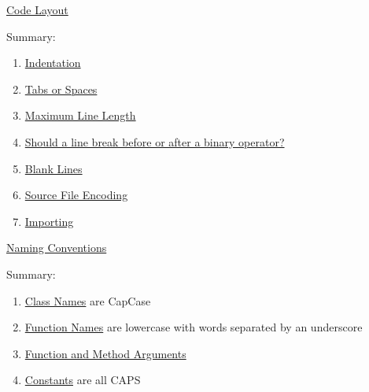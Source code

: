 \documentclass{beamer}
\begin{document}

\begin{frame}{\href{https://www.python.org/dev/peps/pep-0008/\#code-lay-out}{Code Layout}}

Summary:

\begin{enumerate}
    \item \href{https://www.python.org/dev/peps/pep-0008/\#indentation}{Indentation}
    \item \href{https://www.python.org/dev/peps/pep-0008/\#tabs-or-spaces}{Tabs or Spaces}
    \item \href{https://www.python.org/dev/peps/pep-0008/\#maximum-line-length}{Maximum Line Length}
    \item \href{https://www.python.org/dev/peps/pep-0008/\#should-a-line-break-before-or-after-a-binary-operator}{Should a line break before or after a binary operator?}
    \item \href{https://www.python.org/dev/peps/pep-0008/\#blank-lines}{Blank Lines}
    \item \href{https://www.python.org/dev/peps/pep-0008/\#source-file-encoding}{Source File Encoding}
    \item \href{https://www.python.org/dev/peps/pep-0008/\#imports}{Importing}
\end{enumerate}

\end{frame}

\begin{frame}{\href{https://www.python.org/dev/peps/pep-0008/\#naming-conventions}{Naming Conventions}}

Summary:

\begin{enumerate}
    \item \href{https://www.python.org/dev/peps/pep-0008/\#class-names}{Class Names} are CapCase
    \item \href{https://www.python.org/dev/peps/pep-0008/\#function-names}{Function Names} are lowercase with words separated by an underscore
    \item \href{https://www.python.org/dev/peps/pep-0008/\#function-and-method-arguments}{Function and Method Arguments}
    \item \href{https://www.python.org/dev/peps/pep-0008/\#constants}{Constants} are all CAPS
\end{enumerate}

\end{frame}
\end{document}
